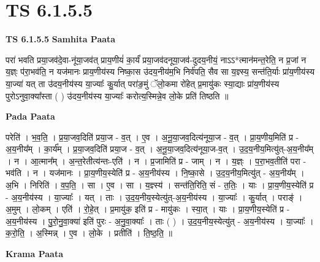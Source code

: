 \documentclass[17pt]{extarticle}
\begin{document}
\section{ TS 6.1.5.5 }

\textbf{TS 6.1.5.5 } \newline
\textbf{Samhita Paata} \newline

परा॑ भवति प्रया॒जव॑दे॒वा-नू॑या॒जव॑त् प्राय॒णीयं॑ का॒र्यं॑ प्रया॒जव॑दनूया॒जव॑-दुदय॒नीयं॒ नाऽऽ*त्मान॑मन्त॒रेति॒ न प्र॒जां न य॒ज्ञ्ः प॑रा॒भव॑ति॒ न यज॑मानः प्राय॒णीय॑स्य निष्का॒स उ॑दय॒नीय॑म॒भि निर्व॑पति॒ सैव सा य॒ज्ञ्स्य॒ सन्त॑ति॒र्याः प्रा॑य॒णीय॑स्य या॒ज्या॑ यत् ता उ॑दय॒नीय॑स्य या॒ज्याः᳚ कु॒र्यात् परा॑ङ॒मुं ॅलो॒कमा रो॑हेत् प्र॒मायु॑कः स्या॒द्याः प्रा॑य॒णीय॑स्य पुरोऽनुवा॒क्या᳚स्ता ( ) उ॑दय॒नीय॑स्य या॒ज्याः᳚ करोत्य॒स्मिन्ने॒व लो॒के प्रति॑ तिष्ठति ॥ \newline

\textbf{Pada Paata} \newline

परेति॑ । भ॒व॒ति॒ । प्र॒या॒जव॒दिति॑ प्रया॒ज - व॒त् । ए॒व । अ॒नू॒या॒जव॒दित्य॑नूया॒ज - व॒त् । प्रा॒य॒णीय॒मिति॑ प्र - अ॒य॒नीय᳚म् । का॒र्य᳚म् । प्र॒या॒जव॒दिति॑ प्रया॒ज - व॒त् । अ॒नू॒या॒जव॒दित्य॑नूया॒ज-व॒त् । उ॒द॒य॒नीय॒मित्यु॑त्-अ॒य॒नीय᳚म् । न । आ॒त्मान᳚म् । अ॒न्त॒रेतीत्य॑न्तः-एति॑ । न । प्र॒जामिति॑ प्र - जाम् । न । य॒ज्ञ्ः । प॒रा॒भव॒तीति॑ परा - भव॑ति । न । यज॑मानः । प्रा॒य॒णीय॒स्येति॑ प्र - अ॒य॒नीय॑स्य । नि॒ष्का॒से । उ॒द॒य॒नीय॒मित्यु॑त् - अ॒य॒नीय᳚म् । अ॒भि । निरिति॑ । व॒प॒ति॒ । सा । ए॒व । सा । य॒ज्ञ्स्य॑ । सन्त॑ति॒रिति॒ सं - त॒तिः॒ । याः । प्रा॒य॒णीय॒स्येति॑ प्र - अ॒य॒नीय॑स्य । या॒ज्याः᳚ । यत् । ताः । उ॒द॒य॒नीय॒स्येत्यु॑त्-अ॒य॒नीय॑स्य । या॒ज्याः᳚ । कु॒र्यात् । पराङ्॑ । अ॒मुम् । लो॒कम् । एति॑ । रो॒हे॒त् । प्र॒मायु॑क॒ इति॑ प्र - मायु॑कः । स्या॒त् । याः । प्रा॒य॒णीय॒स्येति॑ प्र - अ॒य॒नीय॑स्य । पु॒रो॒नु॒वा॒क्या॑ इति॑ पुरः - अ॒नु॒वा॒क्याः᳚ । ताः ( ) । उ॒द॒य॒नीय॒स्येत्यु॑त् - अ॒य॒नीय॑स्य । या॒ज्याः᳚ । क॒रो॒ति॒ । अ॒स्मिन्न् । ए॒व । लो॒के । प्रतीति॑ । ति॒ष्ठ॒ति॒ ॥  \newline


\textbf{Krama Paata} \newline
\end{document}
